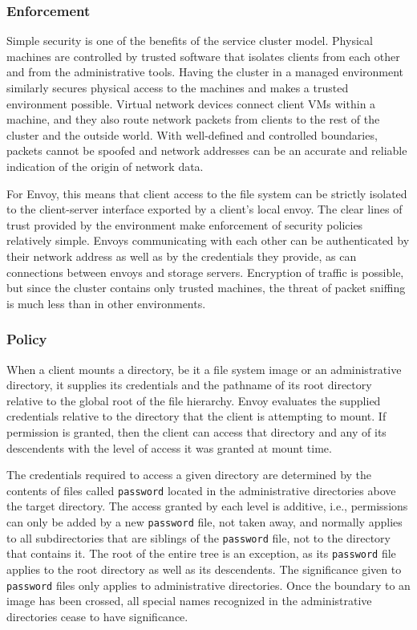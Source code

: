 \subsubsection{Enforcement}

Simple security is one of the benefits of the service cluster model. Physical machines are controlled by trusted software that isolates clients from each other and from the administrative tools. Having the cluster in a managed environment similarly secures physical access to the machines and makes a trusted environment possible. Virtual network devices connect client VMs within a machine, and they also route network packets from clients to the rest of the cluster and the outside world. With well-defined and controlled boundaries, packets cannot be spoofed and network addresses can be an accurate and reliable indication of the origin of network data.

For Envoy, this means that client access to the file system can be strictly isolated to the client-server interface exported by a client's local envoy. The clear lines of trust provided by the environment make enforcement of security policies relatively simple. Envoys communicating with each other can be authenticated by their network address as well as by the credentials they provide, as can connections between envoys and storage servers. Encryption of traffic is possible, but since the cluster contains only trusted machines, the threat of packet sniffing is much less than in other environments.

\subsubsection{Policy}

When a client mounts a directory, be it a file system image or an administrative directory, it supplies its credentials and the pathname of its root directory relative to the global root of the file hierarchy. Envoy evaluates the supplied credentials relative to the directory that the client is attempting to mount. If permission is granted, then the client can access that directory and any of its descendents with the level of access it was granted at mount time.

The credentials required to access a given directory are determined by the contents of files called \texttt{password} located in the administrative directories above the target directory. The access granted by each level is additive, i.e., permissions can only be added by a new \texttt{password} file, not taken away, and normally applies to all subdirectories that are siblings of the \texttt{password} file, not to the directory that contains it. The root of the entire tree is an exception, as its \texttt{password} file applies to the root directory as well as its descendents. The significance given to \texttt{password} files only applies to administrative directories. Once the boundary to an image has been crossed, all special names recognized in the administrative directories cease to have significance.


